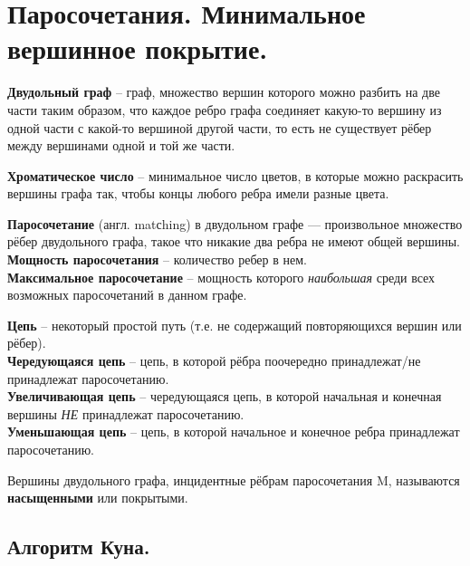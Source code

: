 \section{Паросочетания. Минимальное вершинное покрытие.}%
\label{sec:1. Паросочетания. Минимальное вершинное покрытие.}

\begin{Def}
	\textbf{Двудольный граф} -- граф, множество вершин которого можно разбить на две части таким образом, что каждое ребро графа соединяет какую-то вершину из одной части с какой-то вершиной другой части, то есть не существует рёбер между вершинами одной и той же части.
\end{Def}

\begin{Def}
	\textbf{Хроматическое число} -- минимальное число цветов, в которые можно раскрасить вершины графа так, чтобы концы любого ребра имели разные цвета.
\end{Def}

\begin{Def}
	\textbf{Паросочетание} (англ. matсhing) в двудольном графе — произвольное множество рёбер двудольного графа, такое что никакие два ребра не имеют общей вершины.\\
	\textbf{Мощность паросочетания} -- количество ребер в нем.\\
	\textbf{Максимальное паросочетание} -- мощность которого \textit{наибольшая} среди всех возможных паросочетаний в данном графе.
\end{Def}

\begin{Def}
	\textbf{Цепь} -- некоторый простой путь (т.е. не содержащий повторяющихся вершин или рёбер).\\
	\textbf{Чередующаяся цепь} -- цепь, в которой рёбра поочередно принадлежат/не принадлежат паросочетанию.\\
	\textbf{Увеличивающая цепь} -- чередующаяся цепь, в которой начальная и конечная вершины \textit{НЕ} принадлежат паросочетанию.\\
	\textbf{Уменьшающая цепь} -- цепь, в которой начальное и конечное ребра принадлежат паросочетанию.
\end{Def}

\begin{Def}
	Вершины двудольного графа, инцидентные рёбрам паросочетания M, называются \textbf{насыщенными} или покрытыми. \\
\end{Def}

\subsection*{Алгоритм Куна.}%
\label{sub:Алгоритм Куна.}

